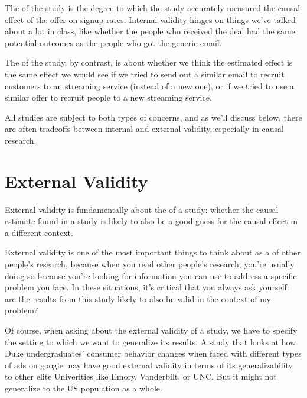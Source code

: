 \documentclass[letterpaper,10pt,english]{jupyterBook}
\begin{document}
\sphinxAtStartPar
The  of the study is the degree to which the study accurately measured the causal effect of the offer on signup rates. Internal validity hinges on things we’ve talked about a lot in class, like whether the people who received the deal had the same potential outcomes as the people who got the generic email.

\sphinxAtStartPar
The  of the study, by contrast, is about whether we think the estimated effect is the same effect we would see if we tried to send out a similar email to recruit customers to an  streaming service (instead of a new one), or if we tried to use a similar offer to recruit people to a new  streaming service.

\sphinxAtStartPar
All studies are subject to both types of concerns, and as we’ll discuss below, there are often trade\sphinxhyphen{}offs between internal and external validity, especially in causal research.


\section{External Validity}
\label{\detokenize{30_questions/17_exploratory_questions_internal_external:external-validity}}
\sphinxAtStartPar
External validity is fundamentally about the  of a study: whether the causal estimate found in a study is likely to also be a good guess for the causal effect in a different context.

\sphinxAtStartPar
External validity is one of the most important things to think about as a  of other people’s research, because when you read other people’s research, you’re usually doing so because you’re looking for information you can use to address a specific problem you face. In these situations, it’s critical that you always ask yourself: are the results from this study likely to also be valid in the context of my problem?

\sphinxAtStartPar
Of course, when asking about the external validity of a study, we have to specify the setting to which we want to generalize its results. A study that looks at how Duke undergraduates’ consumer behavior changes when faced with different types of ads on google may have good external validity in terms of its generalizability to other elite Univerities like Emory, Vanderbilt, or UNC. But it might not generalize to the US population as a whole.
\end{document}
